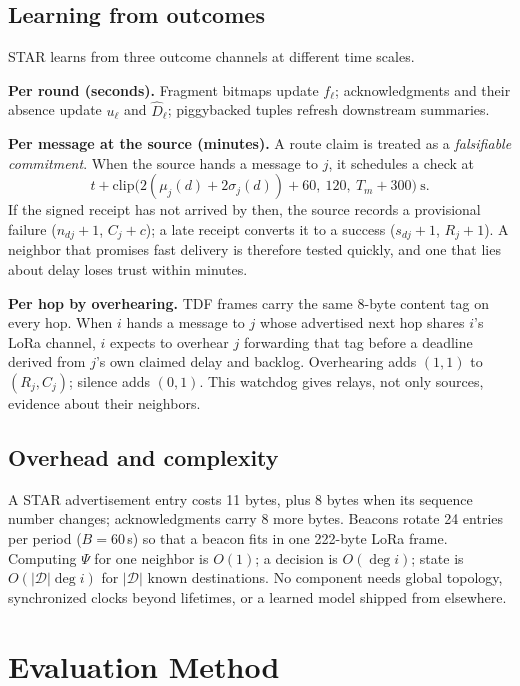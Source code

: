 \documentclass[jou,a4paper,11pt,floatsintext]{apa7}
\begin{document}
\subsection{Learning from outcomes}
\label{sec:learning}

STAR learns from three outcome channels at different time scales.

\textbf{Per round (seconds).} Fragment bitmaps update $f_\ell$; acknowledgments and their absence update $u_\ell$ and $\hat D_\ell$; piggybacked tuples refresh downstream summaries.

\textbf{Per message at the source (minutes).} A route claim is treated as a \emph{falsifiable commitment}. When the source hands a message to $j$, it schedules a check at
\begin{equation}
t+\mathrm{clip}\big(2(\mu_j(d)+2\sigma_j(d))+60,\ 120,\ T_m+300\big)\ \text{s}.
\end{equation}
If the signed receipt has not arrived by then, the source records a provisional failure ($n_{dj}\!+\!1$, $C_j\!+\!c$); a late receipt converts it to a success ($s_{dj}\!+\!1$, $R_j\!+\!1$). A neighbor that promises fast delivery is therefore tested quickly, and one that lies about delay loses trust within minutes.

\textbf{Per hop by overhearing.} TDF frames carry the same 8-byte content tag on every hop. When $i$ hands a message to $j$ whose advertised next hop shares $i$'s LoRa channel, $i$ expects to overhear $j$ forwarding that tag before a deadline derived from $j$'s own claimed delay and backlog. Overhearing adds $(1,1)$ to $(R_j,C_j)$; silence adds $(0,1)$. This watchdog \parencite{marti2000} gives relays, not only sources, evidence about their neighbors.

\subsection{Overhead and complexity}

A STAR advertisement entry costs 11 bytes, plus 8 bytes when its sequence number changes; acknowledgments carry 8 more bytes. Beacons rotate 24 entries per period ($B=60$\,s) so that a beacon fits in one 222-byte LoRa frame. Computing $\Psi$ for one neighbor is $O(1)$; a decision is $O(\deg i)$; state is $O(|\mathcal{D}|\deg i)$ for $|\mathcal{D}|$ known destinations. No component needs global topology, synchronized clocks beyond lifetimes, or a learned model shipped from elsewhere.

\section{Evaluation Method}
\label{sec:method}
\end{document}
